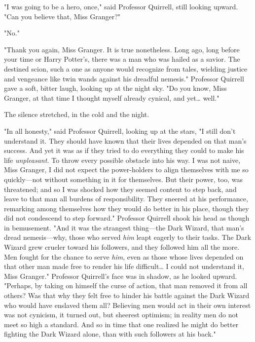 "I was going to be a hero, once," said Professor Quirrell, still looking
upward. "Can you believe that, Miss Granger?"

"No."

"Thank you again, Miss Granger. It is true nonetheless. Long ago, long before
your time or Harry Potter's, there was a man who was hailed as a savior. The
destined scion, such a one as anyone would recognize from tales, wielding
justice and vengeance like twin wands against his dreadful nemesis." Professor
Quirrell gave a soft, bitter laugh, looking up at the night sky. "Do you know,
Miss Granger, at that time I thought myself already cynical, and yet{\ldots}
well."

The silence stretched, in the cold and the night.

"In all honesty," said Professor Quirrell, looking up at the stars, "I still
don't understand it. They should have known that their lives depended on that
man's success. And yet it was as if they tried to do everything they could to
make his life \emph{unpleasant.} To throw every possible obstacle into his way.
I was not naive, Miss Granger, I did not expect the power-holders to align
themselves with me so quickly---not without something in it for themselves. But
their power, too, was threatened; and so I was shocked how they seemed content
to step back, and leave to that man all burdens of responsibility. They sneered
at his performance, remarking among themselves how they would do better in his
place, though they did not condescend to step forward." Professor Quirrell
shook his head as though in bemusement. "And it was the strangest thing---the
Dark Wizard, that man's dread nemesis---why, those who served \emph{him} leapt
eagerly to their tasks. The Dark Wizard grew crueler toward his followers, and
they followed him all the more. Men fought for the chance to serve \emph{him},
even as those whose lives depended on that other man made free to render his
life difficult{\ldots} I could not understand it, Miss Granger." Professor
Quirrell's face was in shadow, as he looked upward. "Perhaps, by taking on
himself the curse of action, that man removed it from all others? Was that why
they felt free to hinder his battle against the Dark Wizard who would have
enslaved them all? Believing men would act in their own interest was not
cynicism, it turned out, but sheerest optimism; in reality men do not meet so
high a standard. And so in time that one realized he might do better fighting
the Dark Wizard alone, than with such followers at his back."

